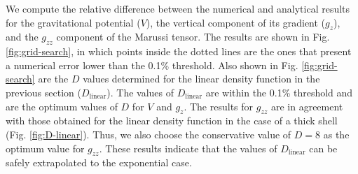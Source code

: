 \documentclass[extra]{gji}
\begin{document}
We compute the relative difference between the numerical and analytical results for the
gravitational potential ($V$), the vertical component of its gradient ($g_z$), and the
$g_{zz}$ component of the Marussi tensor.
The results are shown in Fig. \ref{fig:grid-search}, in which points inside the dotted
lines are the ones that present a numerical error lower than the 0.1\% threshold.
Also shown in Fig. \ref{fig:grid-search} are the $D$ values determined for the linear
density function in the previous section ($D_\text{linear}$).
The values of $D_\text{linear}$ are within the 0.1\% threshold and are the optimum
values of $D$ for $V$ and $g_z$.
The results for $g_{zz}$ are in agreement with those obtained for the linear density
function in the case of a thick shell (Fig. \ref{fig:D-linear}).
Thus, we also choose the conservative value of $D=8$ as the optimum value for $g_{zz}$.
These results indicate that the values of $D_\text{linear}$ can be safely extrapolated
to the exponential case.
\end{document}
